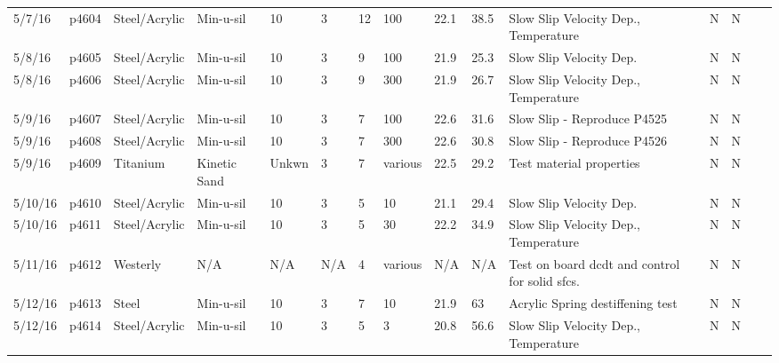 \begin{landscape}
\begin{longtable}{lllllllllllllll}
5/7/16   & p4604      & Steel/Acrylic    & Min-u-sil    & 10           & 3         & 12            & 100                          & 22.1        & 38.5     & Slow Slip Velocity Dep., Temperature            & N     & N    &  &  \\
5/8/16   & p4605      & Steel/Acrylic    & Min-u-sil    & 10           & 3         & 9             & 100                          & 21.9        & 25.3     & Slow Slip Velocity Dep.                         & N     & N    &  &  \\
5/8/16   & p4606      & Steel/Acrylic    & Min-u-sil    & 10           & 3         & 9             & 300                          & 21.9        & 26.7     & Slow Slip Velocity Dep., Temperature            & N     & N    &  &  \\
5/9/16   & p4607      & Steel/Acrylic    & Min-u-sil    & 10           & 3         & 7             & 100                          & 22.6        & 31.6     & Slow Slip - Reproduce P4525                     & N     & N    &  &  \\
5/9/16   & p4608      & Steel/Acrylic    & Min-u-sil    & 10           & 3         & 7             & 300                          & 22.6        & 30.8     & Slow Slip - Reproduce P4526                     & N     & N    &  &  \\
5/9/16   & p4609      & Titanium         & Kinetic Sand & Unkwn            & 3         & 7             & various                      & 22.5        & 29.2     & Test material properties                        & N     & N    &  &  \\
5/10/16  & p4610      & Steel/Acrylic    & Min-u-sil    & 10           & 3         & 5             & 10                           & 21.1        & 29.4     & Slow Slip Velocity Dep.                         & N     & N    &  &  \\
5/10/16  & p4611      & Steel/Acrylic    & Min-u-sil    & 10           & 3         & 5             & 30                           & 22.2        & 34.9     & Slow Slip Velocity Dep., Temperature            & N     & N    &  &  \\
5/11/16  & p4612      & Westerly         & N/A          & N/A          & N/A       & 4             & various                      & N/A         & N/A      & Test on board dcdt and control for solid sfcs.  & N     & N    &  &  \\
5/12/16  & p4613      & Steel            & Min-u-sil    & 10           & 3         & 7             & 10                           & 21.9        & 63       & Acrylic Spring destiffening test                & N     & N    &  &  \\
5/12/16  & p4614      & Steel/Acrylic    & Min-u-sil    & 10           & 3         & 5             & 3                            & 20.8        & 56.6     & Slow Slip Velocity Dep., Temperature            & N     & N    &  & 
\end{longtable}
\end{landscape}